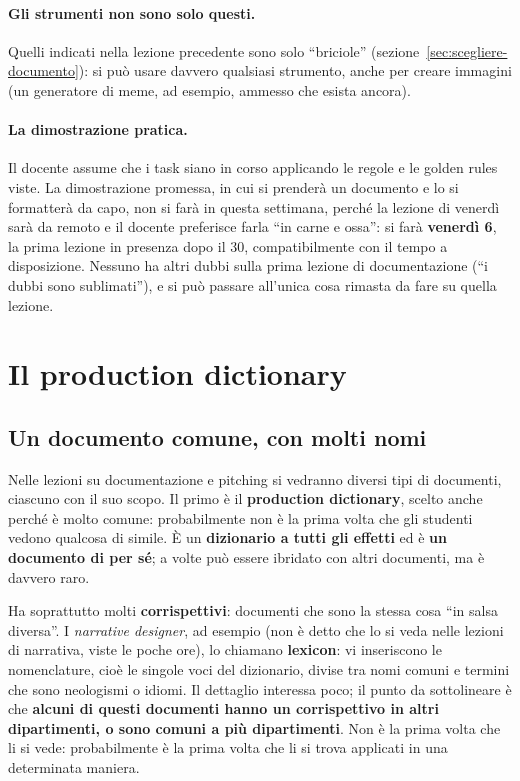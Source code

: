 \paragraph{Gli strumenti non sono solo questi.} Quelli indicati nella lezione
precedente sono solo ``briciole'' (sezione~\ref{sec:scegliere-documento}): si
può usare davvero qualsiasi strumento, anche per creare immagini (un
generatore di meme, ad esempio, ammesso che esista ancora).

\paragraph{La dimostrazione pratica.} Il docente assume che i task siano in
corso applicando le regole e le golden rules viste. La dimostrazione
promessa, in cui si prenderà un documento e lo si formatterà da capo, non si
farà in questa settimana, perché la lezione di venerdì sarà da remoto e il
docente preferisce farla ``in carne e ossa'': si farà \textbf{venerdì 6}, la
prima lezione in presenza dopo il 30, compatibilmente con il tempo a
disposizione. Nessuno ha altri dubbi sulla prima lezione di documentazione
(``i dubbi sono sublimati''), e si può passare all'unica cosa rimasta da fare
su quella lezione.

\section{Il production dictionary}
\label{sec:production-dictionary}



\subsection{Un documento comune, con molti nomi}

Nelle lezioni su documentazione e pitching si vedranno diversi tipi di
documenti, ciascuno con il suo scopo. Il primo è il \textbf{production
dictionary}, scelto anche perché è molto comune: probabilmente non è la
prima volta che gli studenti vedono qualcosa di simile. È un
\textbf{dizionario a tutti gli effetti} ed è \textbf{un documento di per sé};
a volte può essere ibridato con altri documenti, ma è davvero raro.

Ha soprattutto molti \textbf{corrispettivi}: documenti che sono la stessa
cosa ``in salsa diversa''. I \emph{narrative designer}, ad esempio (non è
detto che lo si veda nelle lezioni di narrativa, viste le poche ore), lo
chiamano \textbf{lexicon}: vi inseriscono le nomenclature, cioè le singole
voci del dizionario, divise tra nomi comuni e termini che sono neologismi o
idiomi. Il dettaglio interessa poco; il punto da sottolineare è che
\textbf{alcuni di questi documenti hanno un corrispettivo in altri
dipartimenti, o sono comuni a più dipartimenti}. Non è la prima volta che li
si vede: probabilmente è la prima volta che li si trova applicati in una
determinata maniera.


